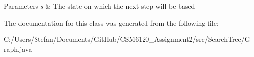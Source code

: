 \begin{DoxyParams}{Parameters}
{\em s} & The state on which the next step will be based \\
\hline
\end{DoxyParams}


The documentation for this class was generated from the following file\+:\begin{DoxyCompactItemize}
\item 
C\+:/\+Users/\+Stefan/\+Documents/\+Git\+Hub/\+C\+S\+M6120\+\_\+\+Assignment2/src/\+Search\+Tree/Graph.\+java\end{DoxyCompactItemize}
